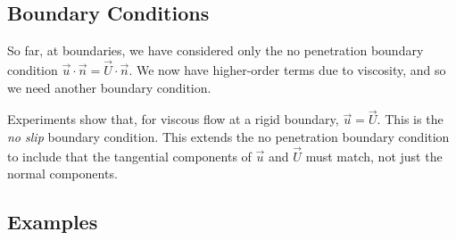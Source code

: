 \documentclass[../Main.tex]{subfiles}
\begin{document}
\subsection{Boundary Conditions}
So far, at boundaries, we have considered only the no penetration boundary condition $\vec{u} \cdot \vec{n} = \vec{U} \cdot \vec{n}$. We now have higher-order terms due to viscosity, and so we need another boundary condition.

Experiments show that, for viscous flow at a rigid boundary, $\vec{u} = \vec{U}$. This is the \textit{no slip} boundary condition. This extends the no penetration boundary condition to include that the tangential components of $\vec{u}$ and $\vec{U}$ must match, not just the normal components.
\subsection{Examples}
\end{document}
